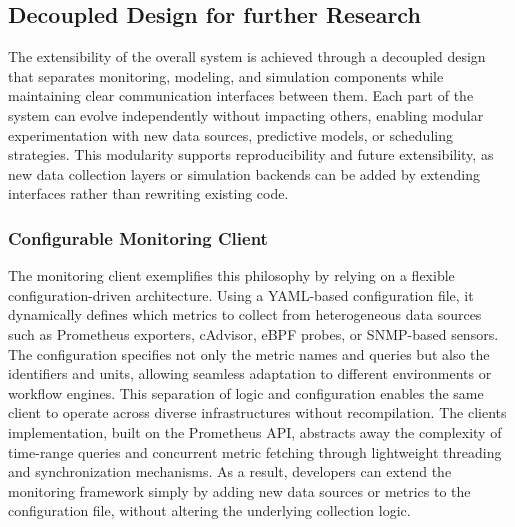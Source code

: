 \begin{table}[H]
{\begin{tabular}{
            p{4.5cm}
            >{\centering\arraybackslash}p{2.8cm}
            p{8.2cm}
            }
            \bottomrule
        \end{tabular}
    }
\end{table}


\subsection{Decoupled Design for further Research}
\label{sec:extensibility_through_decoupled_design}
The extensibility of the overall system is achieved through a decoupled design that separates monitoring, modeling, and simulation components while maintaining clear communication interfaces between them. Each part of the system can evolve independently without impacting others, enabling modular experimentation with new data sources, predictive models, or scheduling strategies. This modularity supports reproducibility and future extensibility, as new data collection layers or simulation backends can be added by extending interfaces rather than rewriting existing code.

\subsubsection{Configurable Monitoring Client}
\label{sec:monitoring_client}
The monitoring client exemplifies this philosophy by relying on a flexible configuration-driven architecture. Using a YAML-based configuration file, it dynamically defines which metrics to collect from heterogeneous data sources such as Prometheus exporters, cAdvisor, eBPF probes, or SNMP-based sensors. The configuration specifies not only the metric names and queries but also the identifiers and units, allowing seamless adaptation to different environments or workflow engines. This separation of logic and configuration enables the same client to operate across diverse infrastructures without recompilation. The clients implementation, built on the Prometheus API, abstracts away the complexity of time-range queries and concurrent metric fetching through lightweight threading and synchronization mechanisms. As a result, developers can extend the monitoring framework simply by adding new data sources or metrics to the configuration file, without altering the underlying collection logic.




